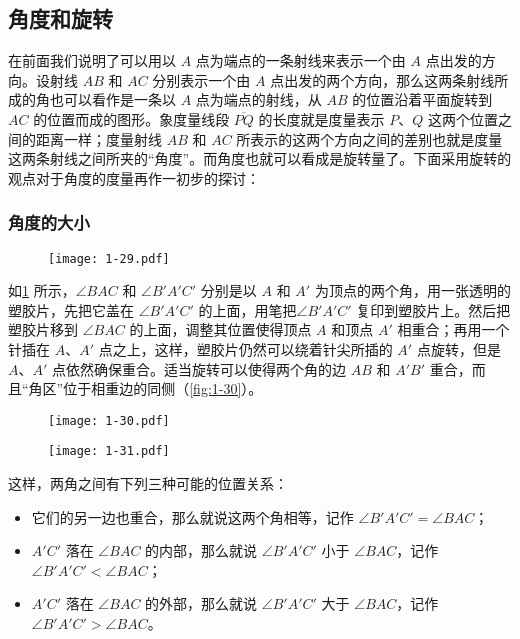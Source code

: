 \subsection{角度和旋转}
在前面我们说明了可以用以 $A$ 点为端点的一条射线来表示一个由 $A$ 点出发的方向。设射线 $AB$ 和 $AC$ 分别表示一个由 $A$ 点出发的两个方向，那么这两条射线所成的角也可以看作是一条以 $A$ 点为端点的射线，从 $AB$ 的位置沿着平面旋转到 $AC$ 的位置而成的图形。象度量线段 $\overline{PQ}$ 的长度就是度量表示 $P$、$Q$ 这两个位置之间的距离一样；度量射线 $AB$ 和 $AC$ 所表示的这两个方向之间的差别也就是度量这两条射线之间所夹的“角度”。而角度也就可以看成是旋转量了。下面采用旋转的观点对于角度的度量再作一初步的探讨：

\subsubsection{角度的大小}
\begin{figure}
	\texttt{[image: 1-29.pdf]}
	\caption{}\label{fig:1-29}
\end{figure}

如\cref{fig:1-29} 所示，$\angle BAC$ 和 $\angle B'A'C'$ 分别是以 $A$ 和 $A'$ 为顶点的两个角，用一张透明的塑胶片，先把它盖在 $\angle B'A'C'$ 的上面，用笔把$\angle B'A'C'$ 复印到塑胶片上。然后把塑胶片移到 $\angle BAC$ 的上面，调整其位置使得顶点 $A$ 和顶点 $A'$ 相重合；再用一个针插在 $A$、$A'$ 点之上，这样，塑胶片仍然可以绕着针尖所插的 $A'$ 点旋转，但是 $A$、$A'$ 点依然确保重合。适当旋转可以使得两个角的边 $AB$ 和 $A'B'$ 重合，而且“角区”位于相重边的同侧（\cref{fig:1-30}）。
\begin{figure}
	\begin{minipage}[b]{0.48\linewidth}
    \centering
		\texttt{[image: 1-30.pdf]}
    \caption{}\label{fig:1-30}
  \end{minipage}
  \begin{minipage}[b]{0.48\linewidth}
    \centering
    \texttt{[image: 1-31.pdf]}
    \caption{}\label{fig:1-31}
  \end{minipage}
\end{figure}


这样，两角之间有下列三种可能的位置关系：
\begin{itemize}
	\item 它们的另一边也重合，那么就说这两个角相等，记作 $\angle B'A'C'=\angle BAC$；
	\item $A'C'$ 落在 $\angle BAC$ 的内部，那么就说 $\angle B'A'C'$ 小于 $\angle BAC$，记作 $\angle B'A'C'<\angle BAC$；
	\item $A'C'$ 落在 $\angle BAC$ 的外部，那么就说 $\angle B'A'C'$ 大于 $\angle BAC$，记作 $\angle B'A'C'>\angle BAC$。
\end{itemize}

